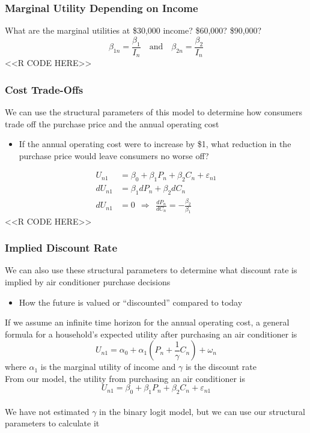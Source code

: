 \documentclass{beamer}
\begin{document}
\begin{frame}[fragile]\frametitle{Marginal Utility Depending on Income}
    What are the marginal utilities at \$30,000 income? \$60,000? \$90,000?
    $$\beta_{1n} = \frac{\beta_1}{I_n} \quad \text{and} \quad \beta_{2n} = \frac{\beta_2}{I_n}$$
    <<R CODE HERE>>
\end{frame}

\begin{frame}[fragile]\frametitle{Cost Trade-Offs}
    We can use the structural parameters of this model to determine how consumers trade off the purchase price and the annual operating cost
    \begin{itemize}
        \item If the annual operating cost were to increase by \$1, what reduction in the purchase price would leave consumers no worse off?
    \end{itemize}
    \begin{align*}
        U_{n1} & = \beta_0 + \beta_1 P_n + \beta_2 C_n + \varepsilon_{n1} \\
        dU_{n1} & = \beta_1 dP_n + \beta_2 dC_n \\
        dU_{n1} & = 0 ~~ \Rightarrow ~~ \frac{dP_n}{dC_n}  = -\frac{\beta_2}{\beta_1}
    \end{align*}
    <<R CODE HERE>>
\end{frame}

\begin{frame}\frametitle{Implied Discount Rate}
    We can also use these structural parameters to determine what discount rate is implied by air conditioner purchase decisions
    \begin{itemize}
        \item How the future is valued or ``discounted'' compared to today
    \end{itemize}
    \vspace{2ex}
    If we assume an infinite time horizon for the annual operating cost, a general formula for a household's expected utility after purchasing an air conditioner is
    $$U_{n1} = \alpha_0 + \alpha_1 \left( P_n + \frac{1}{\gamma} C_n \right) + \omega_n$$
    where $\alpha_1$ is the marginal utility of income and $\gamma$ is the discount rate \\
    \vspace{2ex}
    From our model, the utility from purchasing an air conditioner is
    $$U_{n1} = \beta_0 + \beta_1 P_n + \beta_2 C_n + \varepsilon_{n1}$$ \\
    \vspace{1ex}
    We have not estimated $\gamma$ in the binary logit model, but we can use our structural parameters to calculate it
\end{frame}
\end{document}
